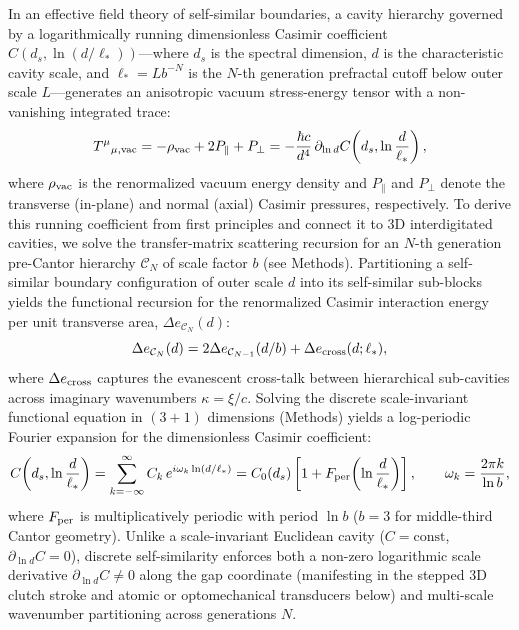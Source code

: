 \documentclass[pdflatex,sn-nature]{sn-jnl}
\begin{document}
In an effective field theory of self-similar boundaries\cite{gordon2026prd}, a cavity hierarchy governed by a logarithmically running dimensionless Casimir coefficient $C(d_s, \ln(d/\ell_*))$---where $d_s$ is the spectral dimension, $d$ is the characteristic cavity scale, and $\ell_* = L b^{-N}$ is the $N$-th generation prefractal cutoff below outer scale $L$---generates an anisotropic vacuum stress-energy tensor with a non-vanishing integrated trace\cite{gordon2026prd}:
\begin{equation}
T^\mu{}_{\mu,\rm vac} = -\rho_{\rm vac} + 2P_\parallel + P_\perp = -\frac{\hbar c}{d^4} \,\partial_{\ln d}C\!\left(d_s, \ln\frac{d}{\ell_*}\right),
\label{eq:trace_running}
\end{equation}
where $\rho_{\rm vac}$ is the renormalized vacuum energy density and $P_\parallel$ and $P_\perp$ denote the transverse (in-plane) and normal (axial) Casimir pressures, respectively. To derive this running coefficient from first principles and connect it to 3D interdigitated cavities, we solve the transfer-matrix scattering recursion for an $N$-th generation pre-Cantor hierarchy $\mathcal{C}_N$ of scale factor $b$ (see Methods). Partitioning a self-similar boundary configuration of outer scale $d$ into its self-similar sub-blocks yields the functional recursion for the renormalized Casimir interaction energy per unit transverse area, $\Delta e_{\mathcal{C}_N}(d)$:
\begin{equation}
\Delta e_{\mathcal{C}_N}(d) = 2 \Delta e_{\mathcal{C}_{N-1}}(d/b) + \Delta e_{\rm cross}(d; \ell_*),
\label{eq:recursion_main}
\end{equation}
where $\Delta e_{\rm cross}$ captures the evanescent cross-talk between hierarchical sub-cavities across imaginary wavenumbers $\kappa = \xi/c$. Solving the discrete scale-invariant functional equation in $(3+1)$ dimensions (Methods) yields a log-periodic Fourier expansion for the dimensionless Casimir coefficient:
\begin{equation}
C\!\left(d_s, \ln\frac{d}{\ell_*}\right) = \sum_{k=-\infty}^{\infty} C_k \, e^{i \omega_k \ln(d/\ell_*)} = C_0(d_s) \left[ 1 + F_{\rm per}\!\left(\ln\frac{d}{\ell_*}\right) \right], \qquad \omega_k = \frac{2\pi k}{\ln b},
\label{eq:fourier_running}
\end{equation}
where $F_{\rm per}$ is multiplicatively periodic with period $\ln b$ ($b=3$ for middle-third Cantor geometry). Unlike a scale-invariant Euclidean cavity ($C = \text{const}$, $\partial_{\ln d} C = 0$), discrete self-similarity enforces both a non-zero logarithmic scale derivative $\partial_{\ln d} C \neq 0$ along the gap coordinate (manifesting in the stepped 3D clutch stroke and atomic or optomechanical transducers below) and multi-scale wavenumber partitioning across generations $N$.
\end{document}
